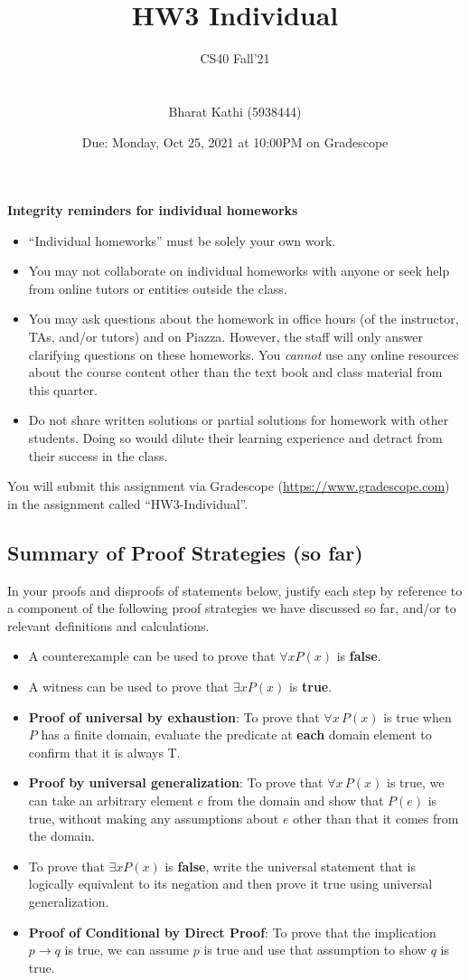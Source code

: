 \documentclass[12pt, oneside]{article}
\title{HW3 Individual}
\author{CS40 Fall'21\\\\\\
Bharat Kathi (5938444)}
\date{Due: Monday, Oct 25, 2021 at 10:00PM on Gradescope}
\begin{document}
\maketitle

{\bf Integrity reminders for individual homeworks}
\begin{itemize}
\item ``Individual homeworks'' must be solely your own work. 
\item You may not collaborate on individual homeworks with anyone or seek help from online tutors or entities outside the class.
\item You may ask questions about the homework in office hours (of the instructor, TAs, and/or tutors) and 
on Piazza.  However, the staff will only answer clarifying questions on these homeworks. You \emph{cannot} use any online resources about the course content other than the text
book and class material from this quarter.
\item Do not share written solutions or partial solutions for homework with other students. Doing so would dilute their learning experience and detract from their success in the class.
\end{itemize}

You will submit this assignment via Gradescope
(\href{https://www.gradescope.com}{https://www.gradescope.com}) in the assignment called ``HW3-Individual''.

\subsection*{Summary of Proof Strategies (so far)}
In your proofs and disproofs of statements below, justify each  step
by reference to  a component of the  following proof  strategies
we  have discussed so far, and/or to relevant definitions and calculations.
\begin{itemize}
    \item A counterexample can be used to prove that  $\forall x P(x)$ is {\bf false}.
    \item  A witness can be used  to  prove that  $\exists x P(x)$ is {\bf true}.
    \item {\bf Proof of universal by exhaustion}: To prove that $\forall x \, P(x)$
is true when $P$ has a finite domain, evaluate the predicate at {\bf each} domain element to confirm that it is always T.
    \item  {\bf Proof by universal generalization}: To prove that $\forall x \, P(x)$
is true, we can take an arbitrary element $e$ from the domain and show that $P(e)$ is true, without making any assumptions about $e$ other than that it comes from the domain.
    \item To  prove  that $\exists x P(x)$ is {\bf false}, write the universal statement that is logically equivalent to its negation and then prove it true using universal generalization.
   
    \item {\bf Proof of Conditional by Direct Proof}: To prove that the implication $p \to q$ is true, we can assume $p$ is true and use that assumption to show $q$ is true.

\end{itemize}
\end{document}
